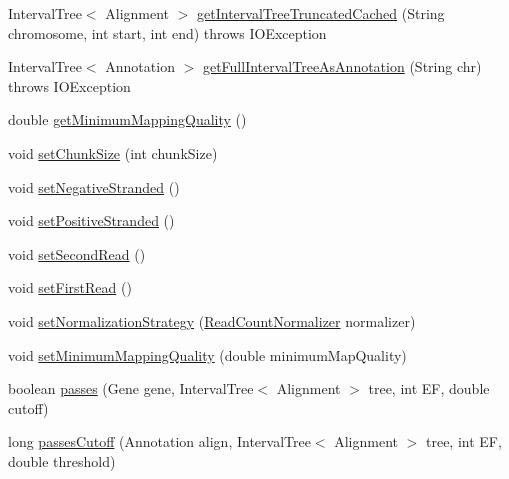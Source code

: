 \begin{DoxyCompactItemize}
Interval\+Tree$<$ Alignment $>$ \hyperlink{interfacebroad_1_1pda_1_1seq_1_1segmentation_1_1_alignment_data_model_a5f38e79de08ea2c450625ee17b4ddf57}{get\+Interval\+Tree\+Truncated\+Cached} (String chromosome, int start, int end)  throws I\+O\+Exception
\item 
Interval\+Tree$<$ Annotation $>$ \hyperlink{interfacebroad_1_1pda_1_1seq_1_1segmentation_1_1_alignment_data_model_a0c395230c930df1c25572915b1be34ca}{get\+Full\+Interval\+Tree\+As\+Annotation} (String chr)  throws I\+O\+Exception
\item 
double \hyperlink{interfacebroad_1_1pda_1_1seq_1_1segmentation_1_1_alignment_data_model_a6bdc47c2740081d2eaa43039ed64b59e}{get\+Minimum\+Mapping\+Quality} ()
\item 
void \hyperlink{interfacebroad_1_1pda_1_1seq_1_1segmentation_1_1_alignment_data_model_ad89bc1748b5f6adfa0ae52f15f759806}{set\+Chunk\+Size} (int chunk\+Size)
\item 
void \hyperlink{interfacebroad_1_1pda_1_1seq_1_1segmentation_1_1_alignment_data_model_a8ce46d47b18ee30cccb2bc044dda8e92}{set\+Negative\+Stranded} ()
\item 
void \hyperlink{interfacebroad_1_1pda_1_1seq_1_1segmentation_1_1_alignment_data_model_a699d89d4a1fdda6b9215fbc45be567a2}{set\+Positive\+Stranded} ()
\item 
void \hyperlink{interfacebroad_1_1pda_1_1seq_1_1segmentation_1_1_alignment_data_model_ae298323ad3086061065ecba18f78b9dd}{set\+Second\+Read} ()
\item 
void \hyperlink{interfacebroad_1_1pda_1_1seq_1_1segmentation_1_1_alignment_data_model_a956b047171cc65bf166e254d8016eff4}{set\+First\+Read} ()
\item 
void \hyperlink{interfacebroad_1_1pda_1_1seq_1_1segmentation_1_1_alignment_data_model_aec08ae772841ac76b9b628c66a1a822d}{set\+Normalization\+Strategy} (\hyperlink{interfacebroad_1_1pda_1_1seq_1_1segmentation_1_1_read_count_normalizer}{Read\+Count\+Normalizer} normalizer)
\item 
void \hyperlink{interfacebroad_1_1pda_1_1seq_1_1segmentation_1_1_alignment_data_model_a14dbe106e617b148c4fe3ce1dd77f172}{set\+Minimum\+Mapping\+Quality} (double minimum\+Map\+Quality)
\item 
boolean \hyperlink{interfacebroad_1_1pda_1_1seq_1_1segmentation_1_1_alignment_data_model_ac6ecb9df95f5a65e82cf90f4b9ff918e}{passes} (Gene gene, Interval\+Tree$<$ Alignment $>$ tree, int E\+F, double cutoff)
\item 
long \hyperlink{interfacebroad_1_1pda_1_1seq_1_1segmentation_1_1_alignment_data_model_a1ca2ee1a3eaceb23d1f163af905c2870}{passes\+Cutoff} (Annotation align, Interval\+Tree$<$ Alignment $>$ tree, int E\+F, double threshold)

\end{DoxyCompactItemize}
